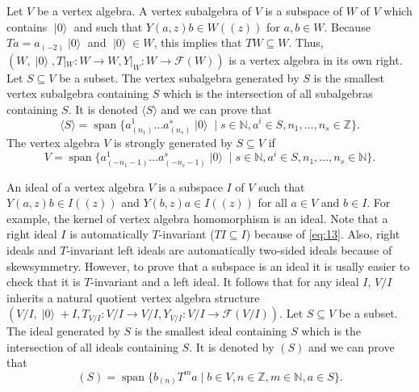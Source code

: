 \documentclass[a4paper, 12pt, reqno]{amsart}
\theoremstyle{remark}
\numberwithin{equation}{subsection}
\DeclareMathOperator{\vspan}{span}
\DeclareMathOperator{\vac}{|0\rangle}
\begin{document}
Let $V$ be a vertex algebra.
A vertex subalgebra of $V$ is a subspace of $W$ of $V$ which contains $\vac$ and such that $Y(a, z)b \in W((z))$ for $a, b\in W$.
Because $Ta = a_{(-2)}\vac$ and $\vac\in W$, this implies that $TW \subseteq W$.
Thus, $(W, \vac, T|_{W}: W \to W, Y|_{W}: W \to \mathcal{F}(W))$ is a vertex algebra in its own right.
Let $S \subseteq V$ be a subset.
The vertex subalgebra generated by $S$ is the smallest vertex subalgebra containing $S$ which is the intersection of all subalgebras containing $S$.
It is denoted $\langle S \rangle$ and we can prove that
\begin{equation*}
  \langle S \rangle = \vspan \{a^1_{(n_1)}\dots a^s_{(n_s)}\vac \mid s \in \mathbb{N}, a^i \in S, n_1, \dots, n_s \in \mathbb{Z}\}.
\end{equation*}
The vertex algebra $V$ is strongly generated by $S \subseteq V$ if
\begin{equation*}
  V = \vspan \{a^1_{(-n_1 - 1)}\dots a^s_{(-n_s - 1)}\vac \mid s \in \mathbb{N}, a^i \in S, n_1, \dots, n_s \in \mathbb{N}\}.
\end{equation*}

An ideal of a vertex algebra $V$ is a subspace $I$ of $V$ such that $Y(a, z)b \in I((z))$ and $Y(b, z)a \in I((z))$ for all $a \in V$ and $b \in I$.
For example, the kernel of vertex algebra homomorphism is an ideal.
Note that a right ideal $I$ is automatically $T$-invariant ($TI \subseteq I$) because of \eqref{eq:13}.
Also, right ideals and $T$-invariant left ideals are automatically two-sided ideals because of skewsymmetry.
However, to prove that a subspace is an ideal it is usally easier to check that it is $T$-invariant and a left ideal.
It follows that for any ideal $I$, $V/I$ inherits a natural quotient vertex algebra structure $(V/I, \vac + I,T_{V/I}: V/I \to V/I, Y_{V/I}: V/I \to \mathcal{F}(V/I))$.
Let $S \subseteq V$ be a subset.
The ideal generated by $S$ is the smallest ideal containing $S$ which is the intersection of all ideals containing $S$.
It is denoted by $(S)$ and we can prove that
\begin{equation*}
  (S) = \vspan\{b_{(n)}T^ma \mid b \in V, n \in \mathbb{Z}, m \in \mathbb{N}, a \in S\}.
\end{equation*}
\end{document}
